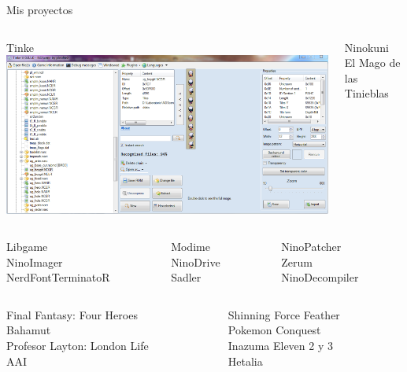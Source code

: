 \begin{frame}{Mis proyectos}
    \setlength{\leftmargini}{0em}
    \begin{columns}
    \begin{column}{0.4\textwidth}
        \Large Tinke
        \includegraphics[width=\textwidth]{tinke_preview.png}
    \end{column}
    \begin{column}{0.6\textwidth}
        \Large Ninokuni \\ El Mago de las Tinieblas
    \end{column}
    \end{columns}

    \vfill
    \small
    \begin{columns}
    \begin{column}{0.3\textwidth}
        Libgame \\
        NinoImager \\
        NerdFontTerminatoR
    \end{column}
    \begin{column}{0.3\textwidth}
        Modime \\
        NinoDrive \\
        Sadler
    \end{column}
    \begin{column}{0.3\textwidth}
        NinoPatcher \\
        Zerum \\
        NinoDecompiler
    \end{column}
    \end{columns}

    \vfill
    \begin{columns}
    \begin{column}{0.5\textwidth}
        Final Fantasy: Four Heroes \\
        Bahamut \\
        Profesor Layton: London Life \\
        AAI
    \end{column}
    \begin{column}{0.5\textwidth}
        Shinning Force Feather \\
        Pokemon Conquest \\
        Inazuma Eleven 2 y 3 \\
        Hetalia
    \end{column}
    \end{columns}
\end{frame}

